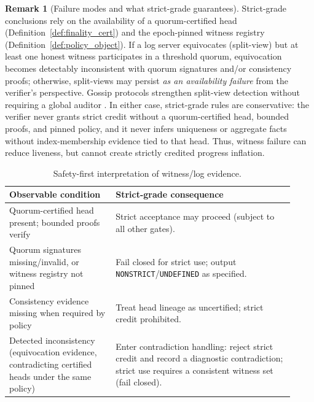 \documentclass[11pt]{article}
\newcommand{\1}{\mathbf{1}}
\theoremstyle{definition}
\newtheorem{remark}{Remark}
\theoremstyle{plain}
\begin{document}
\begin{remark}[Failure modes and what strict-grade guarantees]
\label{rem:witness_failures}
Strict-grade conclusions rely on the availability of a quorum-certified head (Definition~\ref{def:finality_cert}) and the epoch-pinned witness registry (Definition~\ref{def:policy_object}). If a log server equivocates (split-view) but at least one honest witness participates in a threshold quorum, equivocation becomes detectably inconsistent with quorum signatures and/or consistency proofs; otherwise, split-views may persist \emph{as an availability failure} from the verifier's perspective.
Gossip protocols strengthen split-view detection without requiring a global auditor \cite{ChuatGossip2015,MeiklejohnGossipAudits2020}.
In either case, strict-grade rules are conservative: the verifier never grants strict credit without a quorum-certified head, bounded proofs, and pinned policy, and it never infers uniqueness or aggregate facts without index-membership evidence tied to that head. Thus, witness failure can reduce liveness, but cannot create strictly credited progress inflation.
\end{remark}

\begin{table}[H]
\centering
\begin{tabular}{@{}p{0.34\linewidth}p{0.58\linewidth}@{}}
\toprule
Observable condition & Strict-grade consequence \\ \midrule
Quorum-certified head present; bounded proofs verify & Strict acceptance may proceed (subject to all other gates). \\ \addlinespace
Quorum signatures missing/invalid, or witness registry not pinned & Fail closed for strict use; output \texttt{NONSTRICT}/\texttt{UNDEFINED} as specified. \\ \addlinespace
Consistency evidence missing when required by policy & Treat head lineage as uncertified; strict credit prohibited. \\ \addlinespace
Detected inconsistency (equivocation evidence, contradicting certified heads under the same policy) & Enter contradiction handling: reject strict credit and record a diagnostic contradiction; strict use requires a consistent witness set (fail closed). \\ \bottomrule
\end{tabular}
\caption{Safety-first interpretation of witness/log evidence.}
\label{tab:witness_failure_modes}
\end{table}
\end{document}
